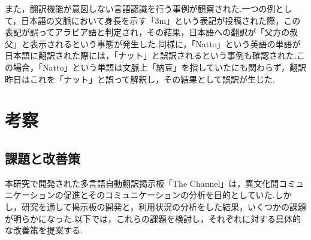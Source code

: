 \documentclass[b5paper,12pt,dvipdfmx]{jsreport}
\begin{document}
また，翻訳機能が意図しない言語認識を行う事例が観察された.一つの例として，日本語の文脈において身長を示す「3m」という表記が投稿された際，この表記が誤ってアラビア語と判定され，その結果，日本語への翻訳が「父方の叔父」と表示されるという事態が発生した.同様に，「Natto」という英語の単語が日本語に翻訳された際には，「ナット」と誤訳されるという事例も確認された.この場合，「Natto」という単語は文脈上「納豆」を指していたにも関わらず，翻訳昨日はこれを「ナット」と誤って解釈し，その結果として誤訳が生じた.





\chapter{考察}

\section{課題と改善策}
本研究で開発された多言語自動翻訳掲示板「The Channel」は，異文化間コミュニケーションの促進とそのコミュニケーションの分析を目的としていた.しかし，研究を通して掲示板の開発と，利用状況の分析をした結果，いくつかの課題が明らかになった.以下では，これらの課題を検討し，それぞれに対する具体的な改善策を提案する.
\end{document}
